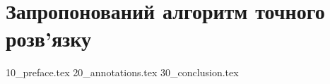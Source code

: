 \chapter{Запропонований алгоритм точного розв'язку}
{10_preface.tex}
{20_annotations.tex}
{30_conclusion.tex}
